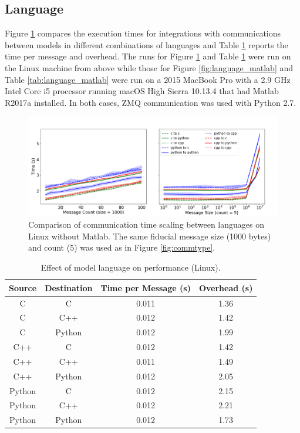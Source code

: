 \documentclass[journal]{IEEEtran}
\begin{document}
\subsection{Language}\label{SS:results_language}
%
Figure \ref{fig:language} compares the execution times for integrations with communications between models in different combinations of languages and Table \ref{tab:language} reports the time per message and overhead. The runs for Figure \ref{fig:language} and Table \ref{tab:language} were run on the Linux machine from above while those for Figure \ref{fig:language_matlab} and Table \ref{tab:language_matlab} were run on a 2015 MacBook Pro with a 2.9 GHz Intel Core i5 processor running macOS High Sierra 10.13.4 that had Matlab R2017a installed. In both cases, ZMQ communication was used with Python 2.7.
%
\ifinclfig
 	\begin{figure}[htbp]
	\begin{center}
	\includegraphics[width=\columnwidth,keepaspectratio]{./images/scaling_language.png}
	\caption{Comparison of communication time scaling between languages on Linux without Matlab. The same fiducial message size (1000 bytes) and count (5) was used as in Figure \ref{fig:commtype}.}
	\label{fig:language}
	\end{center}
	\end{figure}
\fi
%
\begin{table}[htbp]
\begin{center}
\begin{tabular}{|c|c|c|c|}
\hline
Source 	& Destination 	& Time per Message (s) 	& Overhead (s) 	\\\hline
C 				& C					& 0.011				& 1.36			\\
C 				& C++				& 0.012				& 1.42			\\
C 				& Python				& 0.012				& 1.99			\\
\hline%
C++ 				& C					& 0.012				& 1.42			\\
C++ 				& C++				& 0.011				& 1.49			\\
C++ 				& Python				& 0.012				& 2.05			\\
\hline%
Python			& C					& 0.012				& 2.15			\\
Python			& C++				& 0.012				& 2.21			\\
Python			& Python				& 0.012				& 1.73			\\
\hline
\end{tabular}
\end{center}
\caption{Effect of model language on performance (Linux).}
\label{tab:language}
\end{table}%
\end{document}
